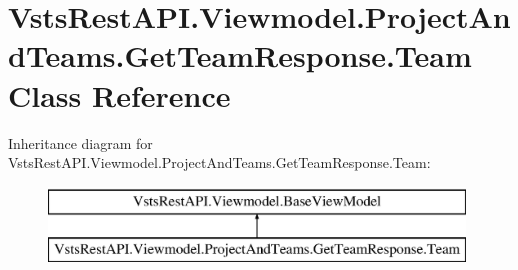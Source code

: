 \hypertarget{class_vsts_rest_a_p_i_1_1_viewmodel_1_1_project_and_teams_1_1_get_team_response_1_1_team}{}\section{Vsts\+Rest\+A\+P\+I.\+Viewmodel.\+Project\+And\+Teams.\+Get\+Team\+Response.\+Team Class Reference}
\label{class_vsts_rest_a_p_i_1_1_viewmodel_1_1_project_and_teams_1_1_get_team_response_1_1_team}
Inheritance diagram for Vsts\+Rest\+A\+P\+I.\+Viewmodel.\+Project\+And\+Teams.\+Get\+Team\+Response.\+Team\+:\begin{figure}[H]
\begin{center}
\leavevmode
\includegraphics[height=2.000000cm]{class_vsts_rest_a_p_i_1_1_viewmodel_1_1_project_and_teams_1_1_get_team_response_1_1_team}
\end{center}
\end{figure}
